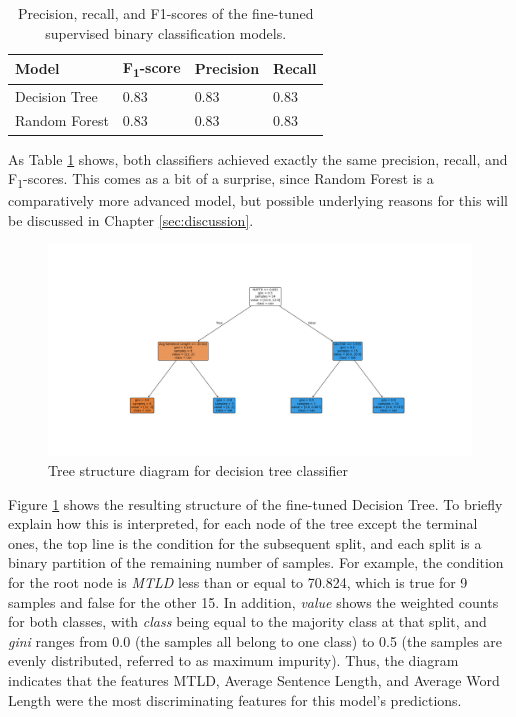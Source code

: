 \documentclass[12pt,a4paper]{article}
\numberwithin{figure}{section}
\numberwithin{table}{section}
\numberwithin{definition}{section}
\begin{document}
\begin{table}[!h]
  \centering
  \caption{Precision, recall, and F1-scores of the fine-tuned supervised binary classification models.}
  \renewcommand{\arraystretch}{1.0}
  \begin{tabular}{|l|l|l|l|}
  \hline
      \textbf{Model} & \textbf{F\textsubscript{1}-score} & \textbf{Precision} & \textbf{Recall} \\ \hline
      Decision Tree & 0.83 & 0.83 & 0.83 \\ 
      Random Forest & 0.83 & 0.83 & 0.83 \\ \hline
  \end{tabular}
  \label{tbl:supervisedevaluation}
\end{table}

As Table \ref{tbl:supervisedevaluation} shows, both classifiers achieved exactly the same precision, recall, and F\textsubscript{1}-scores. This comes as a bit of a surprise, since Random Forest is a comparatively more advanced model, but possible underlying reasons for this will be discussed in Chapter \ref{sec:discussion}.

\begin{figure}[!h]
  \centering
        \includegraphics[width=1.0\textwidth]{decisiontree.png}
        \caption{Tree structure diagram for decision tree classifier}
        \label{fig:decisiontree}
\end{figure}

Figure \ref{fig:decisiontree} shows the resulting structure of the fine-tuned Decision Tree. To briefly explain how this is interpreted, for each node of the tree except the terminal ones, the top line is the condition for the subsequent split, and each split is a binary partition of the remaining number of samples. For example, the condition for the root node is \textit{MTLD} less than or equal to 70.824, which is true for 9 samples and false for the other 15. In addition, \textit{value} shows the weighted counts for both classes, with \textit{class} being equal to the majority class at that split, and \textit{gini} ranges from 0.0 (the samples all belong to one class) to 0.5 (the samples are evenly distributed, referred to as maximum impurity). Thus, the diagram indicates that the features MTLD, Average Sentence Length, and Average Word Length were the most discriminating features for this model's predictions. 
\end{document}

